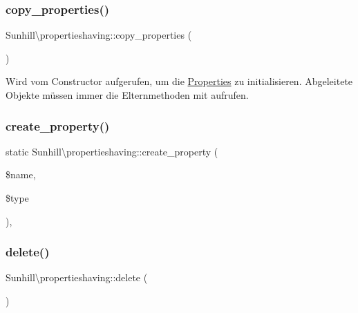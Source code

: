 \subsubsection{\texorpdfstring{copy\+\_\+properties()}{copy\_properties()}}
{\footnotesize\ttfamily Sunhill\textbackslash{}propertieshaving\+::copy\+\_\+properties (\begin{DoxyParamCaption}{ }\end{DoxyParamCaption})\hspace{0.3cm}{\ttfamily [protected]}}

Wird vom Constructor aufgerufen, um die \hyperlink{namespaceSunhill_1_1Properties}{Properties} zu initialisieren. Abgeleitete Objekte müssen immer die Elternmethoden mit aufrufen. \mbox{\label{classSunhill_1_1propertieshaving_a1bdaea4752496e11e2b90bd2ec63c85a}} 
\subsubsection{\texorpdfstring{create\+\_\+property()}{create\_property()}}
{\footnotesize\ttfamily static Sunhill\textbackslash{}propertieshaving\+::create\+\_\+property (\begin{DoxyParamCaption}\item[{}]{\$name,  }\item[{}]{\$type }\end{DoxyParamCaption})\hspace{0.3cm}{\ttfamily [static]}, {\ttfamily [protected]}}

\mbox{\label{classSunhill_1_1propertieshaving_aee8126e25750c5e62a04ed3e66fecdc0}} 
\subsubsection{\texorpdfstring{delete()}{delete()}}
{\footnotesize\ttfamily Sunhill\textbackslash{}propertieshaving\+::delete (\begin{DoxyParamCaption}{ }\end{DoxyParamCaption})}

